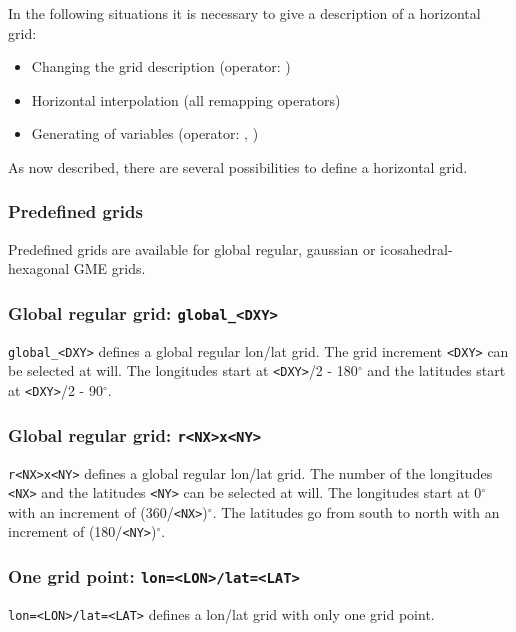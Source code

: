 In the following situations it is necessary to give a description of a horizontal grid:

\begin{itemize}
\item Changing the grid description (operator: )
\item Horizontal interpolation (all remapping operators)
\item Generating of variables (operator: , )
\end{itemize}

As now described, there are several possibilities to define a horizontal grid.

\subsubsection{Predefined grids}

Predefined grids are available for global regular, gaussian or icosahedral-hexagonal GME grids.

\subsubsection*{Global regular grid: \texttt{global\_<DXY>}}
    \texttt{global\_<DXY>} defines a global regular lon/lat grid.
    The grid increment \texttt{<DXY>} can be selected at will.
    The longitudes start at \texttt{<DXY>}/2 - 180$^\circ$ and the
    latitudes start at \texttt{<DXY>}/2 - 90$^\circ$.

\subsubsection*{Global regular grid: \texttt{r<NX>x<NY>}}
    \texttt{r<NX>x<NY>} defines a global regular lon/lat grid.
    The number of the longitudes \texttt{<NX>} and the latitudes \texttt{<NY>} can be selected at will.
    The longitudes start at 0$^\circ$ with an increment of (360/\texttt{<NX>})$^\circ$.
    The latitudes go from south to north with an increment of (180/\texttt{<NY>})$^\circ$.

\subsubsection*{One grid point: \texttt{lon=<LON>/lat=<LAT>}}
    \texttt{lon=<LON>/lat=<LAT>} defines a lon/lat grid with only one grid point.

